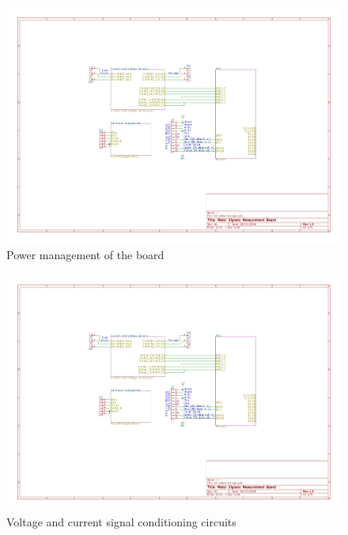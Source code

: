 \begin{figure}
    \includegraphics[width=\textwidth,page=3]{Images/mmb_sch}
    \caption{Power management of the board}
    \label{fig:sch3_mmb}
\end{figure}

\begin{figure}
    \includegraphics[width=\textwidth,page=4]{Images/mmb_sch}
    \caption{Voltage and current signal conditioning circuits}
    \label{fig:sch4_mmb}
\end{figure}